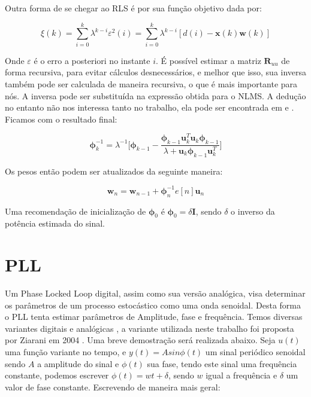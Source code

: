 \indent Outra forma de se chegar ao RLS é por sua função objetivo dada por:

\begin{equation}
\xi(k)=\sum_{i=0}^{k}\lambda^{k-i}\varepsilon^2(i)
=\sum_{i=0}^{k}\lambda^{k-i}[d(i)-\boldsymbol{x}(k) \boldsymbol{w}(k)]
\end{equation}

\indent Onde $\varepsilon$ é o erro a posteriori no instante $i$. É possível estimar a matriz $\boldsymbol{R}_{uu}$ de forma recursiva, para evitar cálculos desnecessários, e melhor que isso, sua inversa também pode ser calculada de maneira recursiva, o que é mais importante para nós. A inversa pode ser substituída na expressão obtida para o NLMS. A dedução no entanto não nos interessa tanto no trabalho, ela pode ser encontrada em \cite{haykin2005adaptive} e \cite{diniz1997adaptive}. Ficamos com o resultado final:

\Large
\begin{equation}
\boldsymbol{\phi}^{-1}_k=\lambda^{-1}\Bigg[\boldsymbol{\phi}_{k-1}-\frac{\boldsymbol{\phi}_{k-1}\boldsymbol{u}^T_k\boldsymbol{u}_k\boldsymbol{\phi}_{k-1}}{\lambda+\boldsymbol{u}_k\boldsymbol{\phi}_{k-1}\boldsymbol{u}^T_k}\Bigg]
\end{equation}
\normalsize

\indent Os pesos então podem ser atualizados da seguinte maneira:

\begin{equation}
\boldsymbol{w}_{n}=\boldsymbol{w}_{n-1} +  \boldsymbol{\phi}_{n}^{-1}e[n] \boldsymbol{u}_{n}
\end{equation}

\indent Uma recomendação de inicialização de $\boldsymbol{\phi}_0$ é $\boldsymbol{\phi}_0=\delta \boldsymbol{I}$, sendo $\delta$ o inverso da potência estimada do sinal.






\section{PLL}

\indent Um Phase Locked Loop digital, assim como sua versão analógica, visa determinar os parâmetros de um processo estocástico como uma onda senoidal. Desta forma o PLL tenta estimar parâmetros de Amplitude, fase e frequência. Temos diversas variantes digitais e analógicas \cite{al2006digital}, a variante utilizada neste trabalho foi proposta por Ziarani em 2004 \cite{ziarani2004method}. Uma breve demostração será realizada abaixo.
\indent Seja $u(t)$ uma função variante no tempo, e $y(t)=Asin\phi(t)$ um sinal periódico senoidal sendo $A$ a amplitude do sinal e $\phi(t)$ sua fase, tendo este sinal uma frequência constante, podemos escrever $\phi(t)=wt+\delta$, sendo $w$ igual a frequência e $\delta$ um valor de fase constante. Escrevendo de maneira mais geral:

